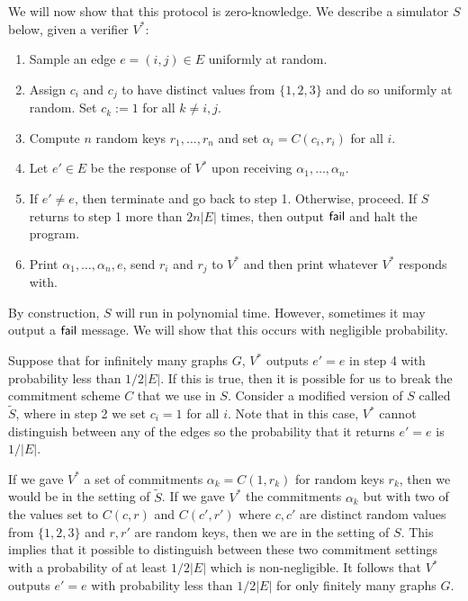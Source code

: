 We will now show that this protocol is zero-knowledge. We describe a simulator $S$ below, given a verifier $V^*$: \begin{enumerate}
\item Sample an edge $e = (i, j) \in E$ uniformly at random.

\item Assign $c_i$ and $c_j$ to have distinct values from $\{ 1, 2, 3 \}$ and do so uniformly at random. Set $c_k := 1$ for all $k \neq i, j$.

\item Compute $n$ random keys $r_1, \ldots, r_n$ and set $\alpha_i = C(c_i, r_i)$ for all $i$.

\item Let $e' \in E$ be the response of $V^*$ upon receiving $\alpha_1, \ldots, \alpha_n$.

\item If $e' \neq e$, then terminate and go back to step 1. Otherwise, proceed. If $S$ returns to step 1 more than $2n |E|$ times, then output $\sf{fail}$ and halt the program.

\item Print $\alpha_1, \ldots, \alpha_n, e$, send $r_i$ and $r_j$ to $V^*$ and then print whatever $V^*$ responds with.
\end{enumerate}

By construction, $S$ will run in polynomial time. However, sometimes it may output a $\sf{fail}$ message. We will show that this occurs with negligible probability.

Suppose that for infinitely many graphs $G$, $V^*$ outputs $e' = e$ in step 4 with probability less than $1/2|E|$. If this is true, then it is possible for us to break the commitment scheme $C$ that we use in $S$. Consider a modified version of $S$ called $\tilde{S}$, where in step 2 we set $c_i = 1$ for all $i$. Note that in this case, $V^*$ cannot distinguish between any of the edges so the probability that it returns $e' = e$ is $1/|E|$.

If we gave $V^*$ a set of commitments $\alpha_k = C(1, r_k)$ for random keys $r_k$, then we would be in the setting of $\tilde{S}$. If we gave $V^*$ the commitments $\alpha_k$ but with two of the values set to $C(c, r)$ and $C(c', r')$ where $c, c'$ are distinct random values from $\{ 1, 2, 3 \}$ and $r, r'$ are random keys, then we are in the setting of $S$. This implies that it possible to distinguish between these two commitment settings with a probability of at least $1/2|E|$ which is non-negligible. It follows that $V^*$ outputs $e' = e$ with probability less than $1/2|E|$ for only finitely many graphs $G$.

